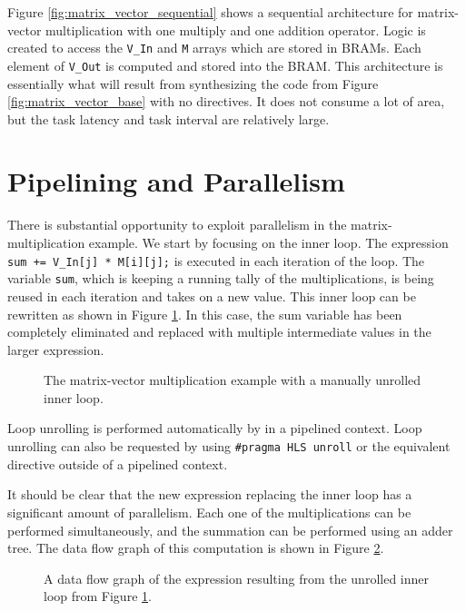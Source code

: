 Figure \ref{fig:matrix_vector_sequential} shows a sequential architecture for matrix-vector multiplication with one multiply and one addition operator.  Logic is created to access the \lstinline|V_In| and \lstinline|M| arrays which are stored in BRAMs. Each element of \lstinline|V_Out| is computed and stored into the BRAM. This architecture is essentially what will result from synthesizing the code from Figure \ref{fig:matrix_vector_base} with no directives. It does not consume a lot of area, but the task latency and task interval are relatively large.

\section{Pipelining and Parallelism}

There is substantial opportunity to exploit parallelism in the matrix-multiplication example. We start by focusing on the inner loop. The expression \lstinline|sum += V_In[j] * M[i][j];| is executed in each iteration of the loop. The variable \lstinline|sum|, which is keeping a running tally of the multiplications, is being reused in each iteration and takes on a new value. This inner loop can be rewritten as shown in Figure \ref{fig:matrix_vector_base_unroll_inner}.  In this case, the sum variable has been completely eliminated and replaced with multiple intermediate values in the larger expression.

\begin{figure}

\caption{The matrix-vector multiplication example with a manually unrolled inner loop.}
\label{fig:matrix_vector_base_unroll_inner}
\end{figure}


\begin{aside}
Loop unrolling is performed automatically by \VHLS in a pipelined context.  Loop unrolling can also be requested by using \lstinline|#pragma HLS unroll| or the equivalent directive outside of a pipelined context.  
\end{aside} 

It should be clear that the new expression replacing the inner loop has a significant amount of parallelism. Each one of the multiplications can be performed simultaneously, and the summation can be performed using an adder tree. The data flow graph of this computation is shown in Figure \ref{fig:matrix_vector_unroll_inner_dfg}. 

\begin{figure}
\centering

\caption{A data flow graph of the expression resulting from the unrolled inner loop from Figure \ref{fig:matrix_vector_base_unroll_inner}.}\label{fig:matrix_vector_unroll_inner_dfg}
\end{figure}

